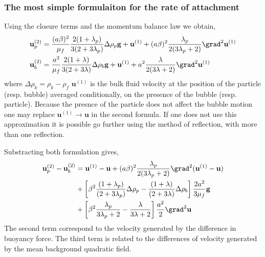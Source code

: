 \subsubsection{The most simple formulaiton for the rate of attachment}
Using the closure terms and the momentum balance law we obtain, 
\begin{align}
    \textbf{u}_p^{(2)} 
    &=
    \frac{(a\beta)^2}{\mu_f}
    \frac{2(1+\lambda_p)}{3(2+3\lambda_p)}\Delta\rho_p\textbf{g}
    + \textbf{u}^{(1)}
    + (a\beta)^2 \frac{\lambda_p}{2(3\lambda_p +2)} \grad^2 \textbf{u}^{(1)}\\
    \textbf{u}_b^{(2)} 
    &=
    \frac{a^2}{\mu_f}
    \frac{2(1+\lambda)}{3(2+3\lambda)}\Delta\rho_b\textbf{g}
    + \textbf{u}^{(1)}
    + a^2 \frac{\lambda}{2(3\lambda +2)} \grad^2 \textbf{u}^{(1)}
\end{align}
where $\Delta\rho_k = \rho_k - \rho_f$ $\textbf{u}^{(1)}$ is the bulk fluid velocity at the position of the particle (resp. bubble) averaged conditionally, on the presence of the bubble (resp. particle). 
Because the presnce of the particle does not affect the bubble motion one may replace $\textbf{u}^{(1)} \to \textbf{u}$ in the second formula.
If one does not use this approximation it is possible go further using the method of reflection, with more than one reflection.  

Substracting both formulation gives, 
\begin{align}
    \textbf{u}_p^{(2)} - \textbf{u}_b^{(2)}
    &=
    \textbf{u}^{(1)} - \textbf{u}
    + (a\beta)^2 \frac{\lambda_p}{2(3\lambda_p +2)} \grad^2 (\textbf{u}^{(1)} - \textbf{u})\\
    &+
    \left[\beta^2\frac{(1+\lambda_p)}{(2+3\lambda_p)}\Delta\rho_p  -\frac{(1+\lambda)}{(2+3\lambda)}\Delta\rho_b  \right] \frac{2a^2}{3\mu_f}\textbf{g}\\
    &+ \left[\beta^2\frac{\lambda_p}{3\lambda_p +2} - \frac{\lambda}{3\lambda +2} \right] \frac{a^2}{2}\grad^2 \textbf{u}
\end{align}
The second term correspond to the velocity generated by the difference in buoyancy force. 
The third term is related to the differences of velocity generated by the mean background quadratic field. 

